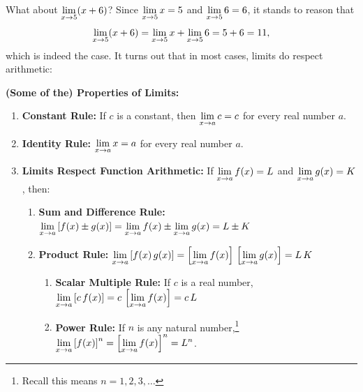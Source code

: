 \documentclass{ximera}
\begin{document}
\medskip

What about $\ds{\lim_{x \rightarrow 5}  (x+6)}$?  Since $\ds{\lim_{x \rightarrow 5} x = 5}$ and $\ds{ \lim_{x \rightarrow 5} 6 = 6}$, it stands to reason that \[\ds{\lim_{x \rightarrow 5}  (x+6) = \lim_{x \rightarrow 5} x  + \lim_{x \rightarrow 5} 6 = 5 + 6 = 11,}\] which is indeed the case.  It turns out that in most cases, limits do respect arithmetic:
\medskip


\begin{theorem}  \label{LimitProp01}  \textbf{(Some of the) Properties of Limits:}

\begin{enumerate}

\item  \textbf{Constant Rule:} If $c$ is a constant, then $\ds{ \lim_{x \rightarrow a} c = c}$ for every real number $a$.

\item \textbf{Identity Rule:} $\ds{ \lim_{x \rightarrow a} x = a}$ for every real number $a$.

\item  \textbf{Limits Respect Function Arithmetic:}  If $\ds{ \lim_{x \rightarrow a} f(x) = L}$ and $\ds{ \lim_{x \rightarrow a} g(x) = K}$, then:

\begin{enumerate}

\item \textbf{Sum and Difference Rule:}  $\ds{\lim_{x \rightarrow a} \left[f(x)\pm g(x)\right] =
\lim_{x \rightarrow a} f(x) \pm \lim_{x \rightarrow a} g(x) = L
\pm K}$

\item \textbf{Product Rule:}  $\ds{\lim_{x \rightarrow a} \left[f(x) \, g(x)\right] =
\left[\lim_{x \rightarrow a} f(x)\right] \, \left[ \lim_{x
\rightarrow a} g(x)\right] = L \, K}$

\begin{enumerate}

\item \textbf{Scalar Multiple Rule:}  If $c$ is a real number, $\ds{\lim_{x \rightarrow a} \left[c \, f(x)\right] =
c \, \left[\lim_{x \rightarrow a} f(x)\right] =c \, L}$


\item \textbf{Power Rule:}  If   $n$ is any
natural number,\footnote{Recall this means  $n = 1,2,3,\ldots$}
$\ds{\lim_{x \rightarrow a} \left[f(x)\right]^{n} = \left[
\lim_{x \rightarrow a} f(x) \right]^{n}= L^{n}}$.
\end{enumerate}


\end{enumerate}
\end{enumerate}
\end{theorem}
\end{document}
